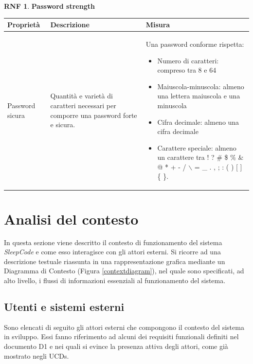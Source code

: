 \documentclass[11pt, a4paper]{article}
\theoremstyle{definition} %
\newtheorem{nonfuncreq}{RNF} %
\begin{document}
\begin{nonfuncreq}
    \textbf{Password strength }
    \begin{center}
        \footnotesize
        \begin{tabularx}{\textwidth}{|X||X||X|}
            \hline
            \cellcolor{red!70}Proprietà & \cellcolor{red!70}Descrizione & \cellcolor{red!70}Misura\\
            \hline
            Password sicura & Quantità e varietà di caratteri necessari per comporre una password forte e sicura. & Una password conforme rispetta:
            \begin{itemize}[leftmargin = *]
                \item Numero di caratteri: compreso tra 8 e 64
                \item Maiuscola-minuscola: almeno una lettera maiuscola e una minuscola
                \item Cifra decimale: almeno una cifra decimale
                \item Carattere speciale: almeno un carattere tra  ! ? \# \$ \% \& @ * + - / $\backslash$ = \_ . , ; : ( ) [ ] \{ \}.
            \end{itemize}\\
            \hline
        \end{tabularx}
    \end{center}
\end{nonfuncreq}





\newpage
\section{Analisi del contesto}
In questa sezione viene descritto il contesto di funzionamento del sistema
\textit{SleepCode} e come esso interagisce con gli attori esterni. Si
ricorre ad una descrizione testuale riassunta in una rappresentazione
grafica mediante un Diagramma di Contesto (Figura \ref{contextdiagram}),
nel quale sono specificati, ad alto livello, i flussi di informazioni
essenziali al funzionamento del sistema.

\subsection{Utenti e sistemi esterni} %
Sono elencati di seguito gli attori esterni che compongono il contesto
del sistema in sviluppo. Essi fanno riferimento ad alcuni dei requisiti
funzionali definiti nel documento D1 e nei quali si evince la presenza
attiva degli attori, come già mostrato negli UCDs.
\end{document}
